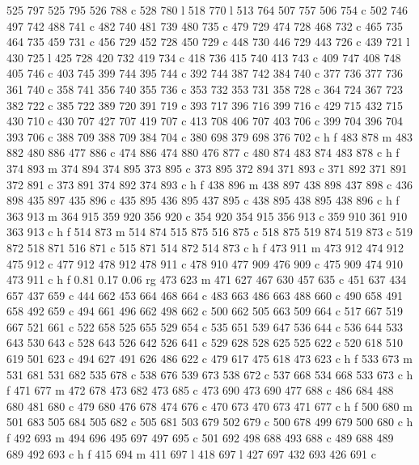 {{   525 797 525 795 526 788 c
   528 780 l
   518 770 l
   513 764 507 757 506 754 c
   502 746 497 742 488 741 c
   482 740 481 739 480 735 c
   479 729 474 728 468 732 c
   465 735 464 735 459 731 c
   456 729 452 728 450 729 c
   448 730 446 729 443 726 c
   439 721 l
   430 725 l
   425 728 420 732 419 734 c
   418 736 415 740 413 743 c
   409 747 408 748 405 746 c
   403 745 399 744 395 744 c
   392 744 387 742 384 740 c
   377 736 377 736 361 740 c
   358 741 356 740 355 736 c
   353 732 353 731 358 728 c
   364 724 367 723 382 722 c
   385 722 389 720 391 719 c
   393 717 396 716 399 716 c
   429 715 432 715 430 710 c
   430 707 427 707 419 707 c
   413 708 406 707 403 706 c
   399 704 396 704 393 706 c
   388 709 388 709 384 704 c
   380 698 379 698 376 702 c
   h f
   483 878 m
   483 882 480 886 477 886 c
   474 886 474 880 476 877 c
   480 874 483 874 483 878 c
   h f
   374 893 m
   374 894 374 895 373 895 c
   373 895 372 894 371 893 c
   371 892 371 891 372 891 c
   373 891 374 892 374 893 c
   h f
   438 896 m
   438 897 438 898 437 898 c
   436 898 435 897 435 896 c
   435 895 436 895 437 895 c
   438 895 438 895 438 896 c
   h f
   363 913 m
   364 915 359 920 356 920 c
   354 920 354 915 356 913 c
   359 910 361 910 363 913 c
   h f
   514 873 m
   514 874 515 875 516 875 c
   518 875 519 874 519 873 c
   519 872 518 871 516 871 c
   515 871 514 872 514 873 c
   h f
   473 911 m
   473 912 474 912 475 912 c
   477 912 478 912 478 911 c
   478 910 477 909 476 909 c
   475 909 474 910 473 911 c
   h f
   0.81 0.17 0.06 rg
   473 623 m
   471 627 467 630 457 635 c
   451 637 434 657 437 659 c
   444 662 453 664 468 664 c
   483 663 486 663 488 660 c
   490 658 491 658 492 659 c
   494 661 496 662 498 662 c
   500 662 505 663 509 664 c
   517 667 519 667 521 661 c
   522 658 525 655 529 654 c
   535 651 539 647 536 644 c
   536 644 533 643 530 643 c
   528 643 526 642 526 641 c
   529 628 528 625 525 622 c
   520 618 510 619 501 623 c
   494 627 491 626 486 622 c
   479 617 475 618 473 623 c
   h f
   533 673 m
   531 681 531 682 535 678 c
   538 676 539 673 538 672 c
   537 668 534 668 533 673 c
   h f
   471 677 m
   472 678 473 682 473 685 c
   473 690 473 690 477 688 c
   486 684 488 680 481 680 c
   479 680 476 678 474 676 c
   470 673 470 673 471 677 c
   h f
   500 680 m
   501 683 505 684 505 682 c
   505 681 503 679 502 679 c
   500 678 499 679 500 680 c
   h f
   492 693 m
   494 696 495 697 497 695 c
   501 692 498 688 493 688 c
   489 688 489 689 492 693 c
   h f
   415 694 m
   411 697 l
   418 697 l
   427 697 432 693 426 691 c
}}
